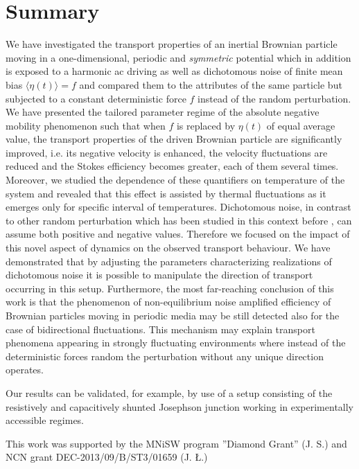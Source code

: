 \documentclass[12pt]{iopart}
\begin{document}
\section{Summary}
\label{sec5}
We have investigated the transport properties of an inertial Brownian particle moving in a one-dimensional, periodic and \emph{symmetric} potential which in addition is exposed to a harmonic ac driving as well as dichotomous noise of finite mean bias $\langle \eta(t) \rangle = f$ and compared them to the attributes of the same particle but subjected to a constant deterministic force $f$ instead of the random perturbation. 
We have presented the tailored parameter regime of the absolute negative mobility phenomenon such that when $f$ is replaced by $\eta(t)$ of equal average value, the transport properties of the driven Brownian particle are significantly improved, i.e. its negative velocity is enhanced, the velocity fluctuations are reduced and the Stokes efficiency becomes greater, each of them several times. Moreover, we studied the dependence of these quantifiers on  temperature of the system and 
revealed that this effect is assisted by  thermal fluctuations as it emerges only for specific interval of temperatures. Dichotomous noise, in contrast to other random perturbation which has been studied in this context before \cite{spiechPRE}, 
can assume both positive and negative values. Therefore we focused on the impact of this novel aspect of dynamics on the observed transport behaviour. We have demonstrated that by adjusting the parameters characterizing realizations of 
dichotomous noise it is possible to manipulate  the direction of transport occurring in this setup. Furthermore, the most far-reaching conclusion of this work is that the 
phenomenon of non-equilibrium noise amplified efficiency of Brownian particles moving in periodic media may be still detected also for the case of bidirectional fluctuations. 
This mechanism may explain transport phenomena appearing in strongly fluctuating environments where instead of the deterministic forces random the perturbation without any unique direction operates.

Our results can be validated, for example, by use of a setup consisting of the resistively and capacitively shunted Josephson junction working in experimentally accessible regimes.

\ack
This work was supported by the MNiSW program ”Diamond Grant” (J. S.) and NCN grant DEC-2013/09/B/ST3/01659 (J. {\L}.)
\end{document}

